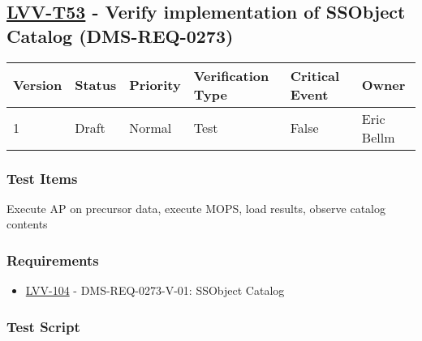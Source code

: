 \hypertarget{lvv-t53---verify-implementation-of-ssobject-catalog-dms-req-0273}{%
\subsection{\texorpdfstring{\href{https://jira.lsstcorp.org/secure/Tests.jspa\#/testCase/LVV-T53}{LVV-T53}
- Verify implementation of SSObject Catalog
(DMS-REQ-0273)}{LVV-T53 - Verify implementation of SSObject Catalog (DMS-REQ-0273)}}\label{lvv-t53---verify-implementation-of-ssobject-catalog-dms-req-0273}}

\begin{longtable}[]{@{}llllll@{}}
\toprule
Version & Status & Priority & Verification Type & Critical Event &
Owner\tabularnewline
\midrule
\endhead
1 & Draft & Normal & Test & False & Eric Bellm\tabularnewline
\bottomrule
\end{longtable}

\hypertarget{test-items-29}{%
\subsubsection{Test Items}\label{test-items-29}}

Execute AP on precursor data, execute MOPS, load results, observe
catalog contents

\hypertarget{requirements-30}{%
\subsubsection{Requirements}\label{requirements-30}}

\begin{itemize}
\tightlist
\item
  \href{https://jira.lsstcorp.org/browse/LVV-104}{LVV-104} -
  DMS-REQ-0273-V-01: SSObject Catalog
\end{itemize}

\hypertarget{test-script-30}{%
\subsubsection{Test Script}\label{test-script-30}}

